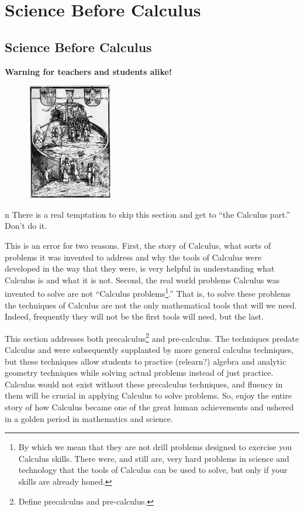 \chapter{Science Before Calculus }
\label{cha:science-before-calc}

\section*{Science Before Calculus}

{\bf{}Warning for teachers and students alike!  }

\begin{figure}
\captionsetup{labelformat=empty}
\includegraphics*[height=2in,width=1.5in]{Figures/NovaScientia}
\label{fig:Figures/NovaScientia}
\end{figure}
n
There is a real temptation to skip this section and get to ``the
Calculus part.'' Don't do it.

This is an error for two reasons.  First, the story of Calculus, what
sorts of problems it was invented to address and why the tools of
Calculus were developed in the way that they were, is very helpful in
understanding what Calculus is and what it is not. Second, the real
world  problems Calculus was invented to solve are not ``Calculus
problems\footnote{By which we mean that they are not drill problems
  designed to exercise you Calculus skills. There were, and still are,
very hard problems in science and technology that the tools of
Calculus can be used to solve, but only if your skills are already
honed.}.''
That is, to solve these problems the techniques of Calculus are not
the only mathematical tools that will we need. Indeed, frequently they
will not be the first tools will need, but the last.

This section addresses both precalculus\footnote{Define
  precalculus and pre-calculus.} and pre-calculus.  The techniques
predate Calculus and were subsequently supplanted by more general
calculus techniques, but these techniques allow students to practice
(relearn?) algebra and analytic geometry techniques while solving
actual problems instead of just practice.  Calculus would not exist
without these precalculus techniques, and fluency in them will be
crucial in applying Calculus to solve problems.  So, enjoy the entire
story of how Calculus became one of the great human achievements and
ushered in a golden period in mathematics and science.

